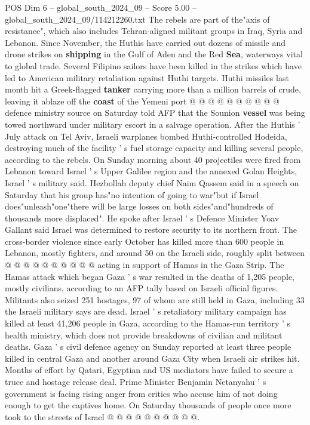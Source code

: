 \begin{textsample}{POS Dim 6 – global\_south\_2024\_09 – Score 5.00 – global\_south\_2024\_09/114212260.txt}
The rebels are part of the"axis of resistance", which also includes Tehran-aligned militant groups in Iraq, Syria and Lebanon.
Since November, the Huthis have carried out dozens of missile and drone strikes on \textbf{shipping} in the Gulf of Aden and the Red \textbf{Sea}, waterways vital to global trade.
Several Filipino sailors have been killed in the strikes which have led to American military retaliation against Huthi targets.
Huthi missiles last month hit a Greek-flagged \textbf{tanker} carrying more than a million barrels of crude, leaving it ablaze off the \textbf{coast} of the Yemeni port @ @ @ @ @ @ @ @ @ @ defence ministry source on Saturday told AFP that the Sounion \textbf{vessel} was being towed northward under military escort in a salvage operation.
After the Huthis ' July attack on Tel Aviv, Israeli warplanes bombed Huthi-controlled Hodeida, destroying much of the facility ' s fuel storage capacity and killing several people, according to the rebels.
On Sunday morning about 40 projectiles were fired from Lebanon toward Israel ' s Upper Galilee region and the annexed Golan Heights, Israel ' s military said.
Hezbollah deputy chief Naim Qassem said in a speech on Saturday that his group has"no intention of going to war"but if Israel does"unleash"one"there will be large losses on both sides"and"hundreds of thousands more displaced".
He spoke after Israel ' s Defence Minister Yoav Gallant said Israel was determined to restore security to its northern front.
The cross-border violence since early October has killed more than 600 people in Lebanon, mostly fighters, and around 50 on the Israeli side, roughly split between @ @ @ @ @ @ @ @ @ @ acting in support of Hamas in the Gaza Strip.
The Hamas attack which began Gaza ' s war resulted in the deaths of 1,205 people, mostly civilians, according to an AFP tally based on Israeli official figures.
Militants also seized 251 hostages, 97 of whom are still held in Gaza, including 33 the Israeli military says are dead.
Israel ' s retaliatory military campaign has killed at least 41,206 people in Gaza, according to the Hamas-run territory ' s health ministry, which does not provide breakdowns of civilian and militant deaths.
Gaza ' s civil defence agency on Sunday reported at least three people killed in central Gaza and another around Gaza City when Israeli air strikes hit.
Months of effort by Qatari, Egyptian and US mediators have failed to secure a truce and hostage release deal.
Prime Minister Benjamin Netanyahu ' s government is facing rising anger from critics who accuse him of not doing enough to get the captives home.
On Saturday thousands of people once more took to the streets of Israel @ @ @ @ @ @ @ @ @ @.

\end{textsample}
